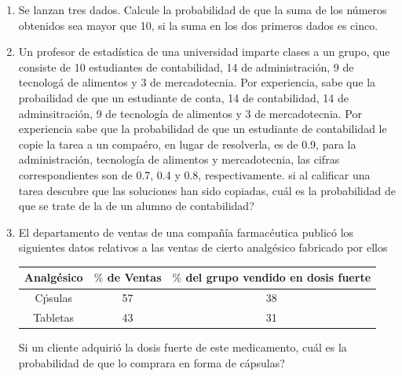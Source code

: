 \begin{Ejer}
\begin{enumerate}
\item Se lanzan tres dados. Calcule la probabilidad de que la suma de los n\'umeros obtenidos sea mayor que 10, si la suma en los dos primeros dados es cinco.

\item Un profesor de estad\'istica de una universidad imparte clases a un grupo, que consiste de 10 estudiantes de contabilidad, 14 de administraci\'on, 9 de tecnolog\'a de alimentos y 3 de mercadotecnia. Por experiencia, sabe que la probailidad de que un estudiante de conta, 14 de contabilidad, 14 de adminsitraci\'on, 9 de tecnolog\'ia de alimentos y 3 de mercadotecnia. Por experiencia sabe que la probabilidad de que un estudiante de contabilidad le copie la tarea a un compa\'ero, en lugar de resolverla, es de 0.9, para la administraci\'on, tecnolog\'ia de alimentos y mercadotecnia, las cifras correspondientes son de 0.7, 0.4 y 0.8, respectivamente. si al calificar una tarea descubre que las soluciones han sido copiadas,  cu\'al es la probabilidad de que se trate de la de un alumno de contabilidad?

\item El departamento de ventas de una compa\~n\'ia farmac\'eutica public\'o los siguientes datos relativos a las ventas de cierto analg\'esico fabricado por ellos
\begin{table}[!ht]
\begin{center}
\begin{tabular}{|c|c|c|}
\hline
 Analg\'esico & $\%$ de Ventas & $\%$ del grupo vendido en dosis fuerte \\\hline
C\'psulas & 57 & 38 \\\hline
Tabletas & 43 & 31 \\\hline
\end{tabular}
\end{center}
\end{table}
Si un cliente adquiri\'o la dosis fuerte de este medicamento,  cu\'al es la probabilidad de que lo comprara en forma de c\'apsulas?

\end{enumerate}
\end{Ejer}

